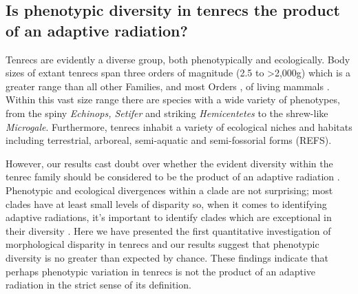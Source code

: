 \documentclass[12pt,a4paper]{article}
\begin{document}




\subsection{Is phenotypic diversity in tenrecs the product of an adaptive radiation?} %

Tenrecs are evidently a diverse group, both phenotypically and ecologically. Body sizes of extant tenrecs span three orders of magnitude (2.5 to \textgreater 2,000g) which is a greater range than all other Families, and most Orders %
, of living mammals \citep{Olson2003}. Within this vast size range there are species with a wide variety of phenotypes, from the spiny \textit{Echinops, Setifer} and striking \textit{Hemicentetes} to the shrew-like  \textit{Microgale}. Furthermore, tenrecs inhabit a variety of ecological niches and habitats including terrestrial, arboreal, semi-aquatic and semi-fossorial forms (REFS).

However, our results cast doubt over whether the evident diversity within the tenrec family should be considered to be the product of an adaptive radiation %
. Phenotypic and ecological divergences within a clade are not surprising; most clades have at least small levels of disparity so, when it comes to identifying adaptive radiations, it's important to identify clades which are exceptional in their diversity \citep{Losos2010a}. Here we have presented the first quantitative investigation of morphological disparity in tenrecs and our results suggest that phenotypic diversity is no greater than expected by chance. These findings indicate that perhaps phenotypic variation in tenrecs is not the product of an adaptive radiation in the strict sense of its definition.
\end{document}
